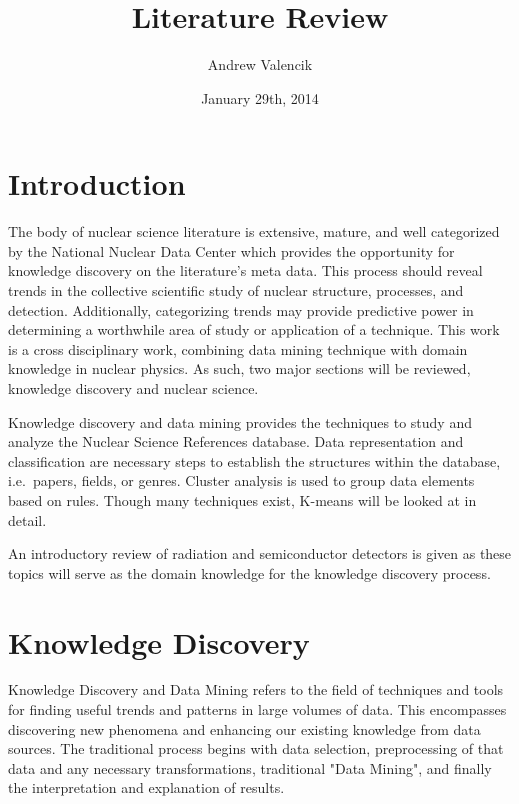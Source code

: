 \documentclass[12pt]{article}
\begin{document}
\title{Literature Review}
\author{Andrew Valencik}
\date{January 29th, 2014}
\maketitle
\tableofcontents
\listoffigures
\begin{doublespacing}

\pagebreak
\section{Introduction}

The body of nuclear science literature is extensive, mature, and well categorized by the National Nuclear Data Center \citep{Kurgan200603} which provides the opportunity for knowledge discovery on the literature's meta data.
This process should reveal trends in the collective scientific study of nuclear structure, processes, and detection.
Additionally, categorizing trends may provide predictive power in determining a worthwhile area of study or application of a technique.
This work is a cross disciplinary work, combining data mining technique with domain knowledge in nuclear physics. 
As such, two major sections will be reviewed, knowledge discovery and nuclear science.

Knowledge discovery and data mining provides the techniques to study and analyze the Nuclear Science References database.
Data representation and classification are necessary steps to establish the structures within the database, i.e.\ papers, fields, or genres.
Cluster analysis is used to group data elements based on rules.
Though many techniques exist, K-means will be looked at in detail.

An introductory review of radiation and semiconductor detectors is given as these topics will serve as the domain knowledge for the knowledge discovery process. 


\pagebreak
\section{Knowledge Discovery}
Knowledge Discovery and Data Mining refers to the field of techniques and tools for finding useful trends and patterns in large volumes of data.
This encompasses discovering new phenomena and enhancing our existing knowledge from data sources.
The traditional process begins with data selection, preprocessing of that data and any necessary transformations, traditional "Data Mining", and finally the interpretation and explanation of results.


\end{doublespacing}
\end{document}
